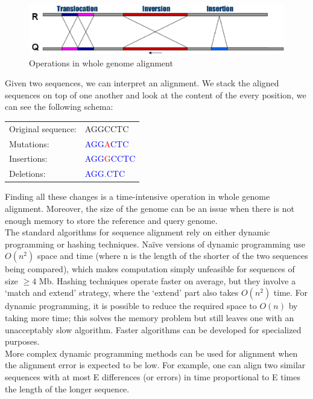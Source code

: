 \documentclass[10pt]{bmc_article}
\newenvironment{bmcformat}{\begin{raggedright}\baselineskip20pt\sloppy\setboolean{publ}{false}}{\end{raggedright}\baselineskip20pt\sloppy}
\begin{document}
\begin{bmcformat}
\begin{figure}[hbp] 
  \begin{center}
      \includegraphics[scale=0.5]{schema.eps}
    \caption{Operations in whole genome alignment}
    \label{schema}
  \end{center}
\end{figure}
Given two sequences, we can interpret an alignment. We stack the aligned sequences on top of one another and look at the content of the every position, we can see the following schema:
\begin{center}
\begin{tabular}{l l}
Original sequence:& AGGCCTC \\
Mutations:& \textcolor{blue}{AGG}\textcolor{red}{A}\textcolor{blue}{CTC} \\
Insertions:& \textcolor{blue}{AGG}\textcolor{red}{G}\textcolor{blue}{CCTC} \\
Deletions:& \textcolor{blue}{AGG}\textcolor{green}{.}\textcolor{blue}{CTC} \\
\end{tabular}
\end{center}
Finding all these changes is a time-intensive operation in whole genome alignment. Moreover, the size of the genome can be an issue when there is not enough memory to store the reference and query genome.\\
The standard algorithms for sequence alignment rely on either dynamic programming or hashing techniques. Naïve versions of dynamic programming use $O(n^2)$ space and time (where n is the length of the shorter of the two sequences being compared), which makes computation simply unfeasible for sequences of size $\ge 4$ Mb. Hashing techniques operate faster on average, but they involve a ‘match and extend’ strategy, where the ‘extend’ part also takes $O(n^2)$ time. For dynamic programming, it is possible to reduce the required space to $O(n)$ by taking more time; this solves the memory problem but still leaves one with an unacceptably slow algorithm. Faster algorithms can be developed for specialized purposes.\\
More complex dynamic programming methods can be used for alignment when the alignment error is expected to be low. For example, one can align two similar sequences with at most E differences (or errors) in time proportional to E times the length of the longer sequence.

\end{bmcformat}
\end{document}
